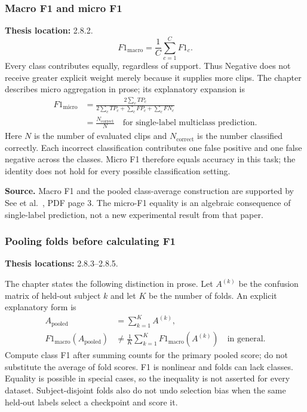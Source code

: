 \documentclass[11pt,a4paper]{article}
\numberwithin{equation}{section}
\begin{document}
\subsubsection{Macro F1 and micro F1}
\label{fg:macro}
\textbf{Thesis location:} 2.8.2.
\begin{equation}
    F1_{\mathrm{macro}}=\frac1C\sum_{c=1}^{C}F1_c.
    \label{fg:eq:macro}
\end{equation}
Every class contributes equally, regardless of support. Thus Negative does
not receive greater explicit weight merely because it supplies more clips.
The chapter describes micro aggregation in prose; its explanatory expansion is
\begin{equation}
\begin{aligned}
    F1_{\mathrm{micro}}&=
    \frac{2\sum_c TP_c}{2\sum_c TP_c+\sum_c FP_c+\sum_c FN_c}\\
    &=\frac{N_{\mathrm{correct}}}{N}
    \quad\text{for single-label multiclass prediction}.
\end{aligned}
    \label{fg:eq:micro}
\end{equation}
Here $N$ is the number of evaluated clips and $N_{\mathrm{correct}}$ is the
number classified correctly. Each incorrect classification contributes one false positive and one false
negative across the classes. Micro F1 therefore equals accuracy in this task;
the identity does not hold for every possible classification setting.

\textbf{Source.} Macro F1 and the pooled class-average construction are
supported by See et al.~\cite{see2019}, PDF page 3. The micro-F1 equality is
an algebraic consequence of single-label prediction, not a new experimental
result from that paper.

\subsubsection{Pooling folds before calculating F1}
\label{fg:fold-pooling}
\textbf{Thesis locations:} 2.8.3--2.8.5.

The chapter states the following distinction in prose. Let $A^{(k)}$ be the
confusion matrix of held-out subject $k$ and let $K$ be the number of folds.
An explicit explanatory form is
\begin{equation}
\begin{aligned}
    A_{\mathrm{pooled}}&=\sum_{k=1}^{K}A^{(k)},\\
    F1_{\mathrm{macro}}(A_{\mathrm{pooled}})
       &\ne \frac1K\sum_{k=1}^{K}F1_{\mathrm{macro}}(A^{(k)})
       \quad\text{in general}.
\end{aligned}
    \label{fg:eq:pooling}
\end{equation}
Compute class F1 after summing counts for the primary pooled score; do not
substitute the average of fold scores. F1 is nonlinear and folds can lack
classes. Equality is possible in special cases, so the inequality is not
asserted for every dataset. Subject-disjoint folds also do not undo selection
bias when the same held-out labels select a checkpoint and score it.
\end{document}
